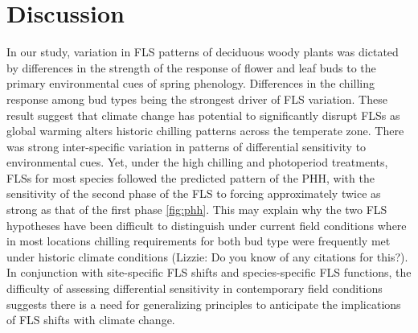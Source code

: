 \documentclass[11pt]{article}
\begin{document}
\section*{Discussion}
\noindent In our study, variation in FLS patterns of deciduous woody plants was dictated by differences in the strength of the response of flower and leaf buds to the primary environmental cues of spring phenology. Differences in the chilling response among bud types being the strongest driver of FLS variation. These result suggest that climate change has potential to significantly disrupt FLSs as global warming alters historic chilling patterns across the temperate zone. There was strong inter-specific variation in patterns of differential sensitivity to environmental cues. Yet, under the high chilling and photoperiod treatments, FLSs for most species followed the predicted pattern of the PHH, with the sensitivity of the second phase of the FLS to forcing approximately twice as strong as that of the first phase \ref{fig:phh}. This may explain why the two FLS hypotheses have been difficult to distinguish under current field conditions where in most locations chilling requirements for both bud type were frequently met under historic climate conditions \citep{}(Lizzie: Do you know of any citations for this?). In conjunction with site-specific FLS shifts and species-specific FLS functions, the difficulty of assessing differential sensitivity in contemporary field conditions suggests there is a need for generalizing principles to  anticipate the implications of FLS shifts%
with climate change.
\end{document}
